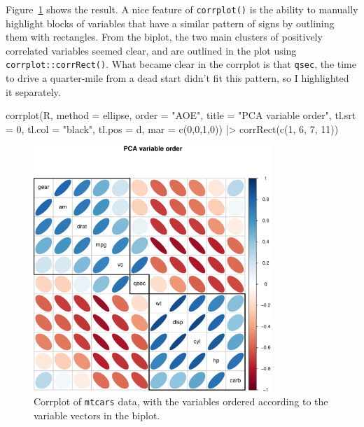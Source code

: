 \documentclass[
  letterpaper,
  10pt,
  krantz2]{krantz}
\makeatletter
\newenvironment{Shaded}{\begin{snugshade}}{\end{snugshade}}
\newcommand{\AttributeTok}[1]{\textcolor[rgb]{0.40,0.45,0.13}{#1}}
\newcommand{\DecValTok}[1]{\textcolor[rgb]{0.68,0.00,0.00}{#1}}
\newcommand{\FunctionTok}[1]{\textcolor[rgb]{0.28,0.35,0.67}{#1}}
\newcommand{\NormalTok}[1]{\textcolor[rgb]{0.00,0.23,0.31}{#1}}
\newcommand{\SpecialCharTok}[1]{\textcolor[rgb]{0.37,0.37,0.37}{#1}}
\newcommand{\StringTok}[1]{\textcolor[rgb]{0.13,0.47,0.30}{#1}}
\newenvironment{kframe}{%
  \medskip{}
  \setlength{\fboxsep}{.8em}
  \def\at@end@of@kframe{}%
  \ifinner\ifhmode%
  \def\at@end@of@kframe{\end{minipage}}%
  \begin{minipage}{\columnwidth}%
  \fi\fi%
  \def\FrameCommand##1{\hskip\@totalleftmargin \hskip-\fboxsep
  \colorbox{shadecolor}{##1}\hskip-\fboxsep
      \hskip-\linewidth \hskip-\@totalleftmargin \hskip\columnwidth}%
  \MakeFramed {\advance\hsize-\width
    \@totalleftmargin\z@ \linewidth\hsize
    \@setminipage}}%
{\par\unskip\endMakeFramed%
  \at@end@of@kframe}
\renewenvironment{Shaded}{\begin{kframe}}{\end{kframe}}
\makeatother
\begin{document}
Figure~\ref{fig-mtcars-corrplot-pcaorder} shows the result. A nice
feature of \texttt{corrplot()} is the ability to manually highlight
blocks of variables that have a similar pattern of signs by outlining
them with rectangles. From the biplot, the two main clusters of
positively correlated variables seemed clear, and are outlined in the
plot using \texttt{corrplot::corrRect()}. What became clear in the
corrplot is that \texttt{qsec}, the time to drive a quarter-mile from a
dead start didn't fit this pattern, so I highlighted it separately.

\begin{Shaded}
\begin{Highlighting}[]
\FunctionTok{corrplot}\NormalTok{(R, }
         \AttributeTok{method =} \StringTok{\textquotesingle{}ellipse\textquotesingle{}}\NormalTok{, }
         \AttributeTok{order =} \StringTok{"AOE"}\NormalTok{,}
         \AttributeTok{title =} \StringTok{"PCA variable order"}\NormalTok{,}
         \AttributeTok{tl.srt =} \DecValTok{0}\NormalTok{, }\AttributeTok{tl.col =} \StringTok{"black"}\NormalTok{, }\AttributeTok{tl.pos =} \StringTok{\textquotesingle{}d\textquotesingle{}}\NormalTok{,}
         \AttributeTok{mar =} \FunctionTok{c}\NormalTok{(}\DecValTok{0}\NormalTok{,}\DecValTok{0}\NormalTok{,}\DecValTok{1}\NormalTok{,}\DecValTok{0}\NormalTok{)) }\SpecialCharTok{|\textgreater{}}
  \FunctionTok{corrRect}\NormalTok{(}\FunctionTok{c}\NormalTok{(}\DecValTok{1}\NormalTok{, }\DecValTok{6}\NormalTok{, }\DecValTok{7}\NormalTok{, }\DecValTok{11}\NormalTok{))}
\end{Highlighting}
\end{Shaded}

\begin{figure}[H]

{\centering \includegraphics[width=0.8\textwidth,height=\textheight]{figs/ch04/fig-mtcars-corrplot-pcaorder-1.pdf}

}

\caption{\label{fig-mtcars-corrplot-pcaorder}Corrplot of \texttt{mtcars}
data, with the variables ordered according to the variable vectors in
the biplot.}

\end{figure}
\end{document}
